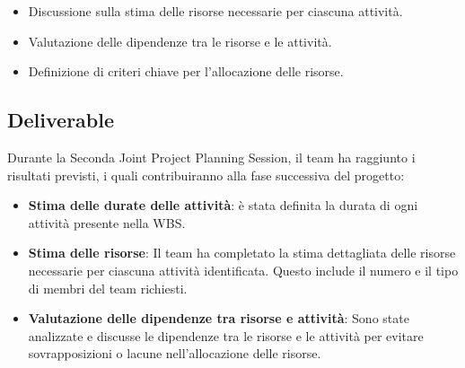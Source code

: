 \begin{itemize}
    \item Discussione sulla stima delle risorse necessarie per ciascuna attività.
    \item Valutazione delle dipendenze tra le risorse e le attività.
    \item Definizione di criteri chiave per l'allocazione delle risorse.
\end{itemize}

\subsection{Deliverable}

Durante la Seconda Joint Project Planning Session, il team ha raggiunto i risultati previsti, i quali contribuiranno alla fase successiva del progetto:

\begin{itemize}
    \item \textbf{Stima delle durate delle attività}: è stata definita la durata di ogni attività presente nella WBS.
    \item \textbf{Stima delle risorse}: Il team ha completato la stima dettagliata delle risorse necessarie per ciascuna attività identificata. Questo include il numero e il tipo di membri del team richiesti.
    \item \textbf{Valutazione delle dipendenze tra risorse e attività}: Sono state analizzate e discusse le dipendenze tra le risorse e le attività per evitare sovrapposizioni o lacune nell'allocazione delle risorse.
\end{itemize}

